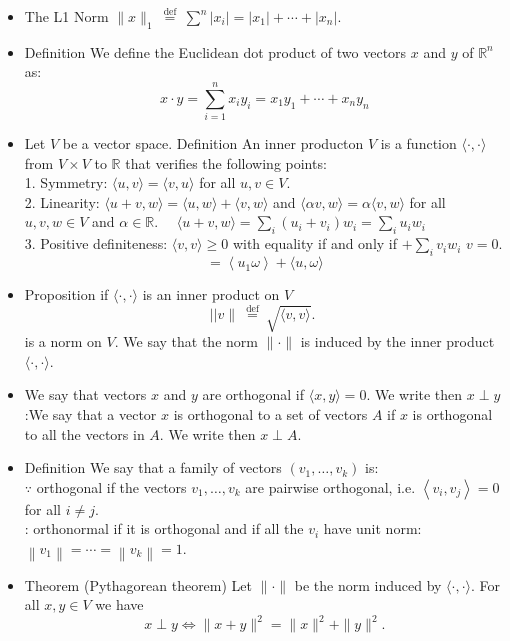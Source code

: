 \documentclass[12pt,twoside]{article}
\begin{document}
\begin{itemize}
\item The L1 Norm $\|x\|_1 \stackrel{\text { def }}{=} \sum^n\left|x_i\right|=\left|x_1\right|+\cdots+\left|x_n\right| \text {. }$
\item Definition
We define the Euclidean dot product of two vectors $x$ and $y$ of $\mathbb{R}^n$ as:
$$
x \cdot y=\sum_{i=1}^n x_i y_i=x_1 y_1+\cdots+x_n y_n
$$
\item {} Let $V$ be a vector space.
Definition
An inner producton $V$ is a function $\langle\cdot, \cdot\rangle$ from $V \times V$ to $\mathbb{R}$ that verifies the following points:
\\1. Symmetry: $\langle u, v\rangle=\langle v, u\rangle$ for all $u, v \in V$.
\\2. Linearity: $\langle u+v, w\rangle=\langle u, w\rangle+\langle v, w\rangle$ and $\langle\alpha v, w\rangle=\alpha\langle v, w\rangle$ for all $u, v, w \in V$ and $\alpha \in \mathbb{R}$. $\quad\langle u+v, w\rangle=\sum_i\left(u_i+v_i\right) w_i=\sum_i u_i w_i$
\\3. Positive definiteness: $\langle v, v\rangle \geq 0$ with equality if and only if $+\sum_i v_i w_i$ $v=0$.
$$
=\left\langle u_1 \omega\right\rangle+\langle u, \omega\rangle
$$

\item {}
Proposition if  $\langle\cdot, \cdot\rangle$ is an inner product on $V$ 
$$
||v\| \stackrel{\text { def }}{=} \sqrt{\langle v, v\rangle} \text {. }
$$
is a norm on $V$. We say that the norm $\|\cdot\|$ is induced by the inner product $\langle\cdot, \cdot\rangle$.

\item {} We say that vectors $x$ and $y$ are orthogonal if $\langle x, y\rangle=0$. We write then $x \perp y$
:We say that a vector $x$ is orthogonal to a set of vectors $A$ if $x$ is orthogonal to all the vectors in $A$. We write then $x \perp A$.


\item Definition
We say that a family of vectors $\left(v_1, \ldots, v_k\right)$ is:
\\$\because$ orthogonal if the vectors $v_1, \ldots, v_k$ are pairwise orthogonal, i.e. $\left\langle v_i, v_j\right\rangle=0$ for all $i \neq j$.
\\ : orthonormal if it is orthogonal and if all the $v_i$ have unit norm: $\left\|v_1\right\|=\cdots=\left\|v_k\right\|=1$.

\item {} Theorem (Pythagorean theorem)
Let $\|\cdot\|$ be the norm induced by $\langle\cdot, \cdot\rangle$. For all $x, y \in V$ we have
$$
x \perp y \Longleftrightarrow\|x+y\|^2=\|x\|^2+\|y\|^2 .
$$


\end{itemize}
\end{document}

